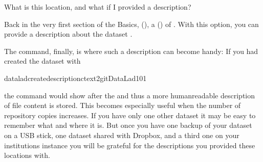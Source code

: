 \ignorespaces \begin{findoutmore}[label={fom-clone-description}, before title={\thetcbcounter\ }, float, floatplacement=tb, check odd page=true]{What is this location, and what if I provided a description?}
\label{\detokenize{basics/101-117-sharelocal2:fom-clone-description}}

\sphinxAtStartPar
Back in the very first section of the Basics, {\hyperref[\detokenize{basics/101-101-create:createds}]{}} (), a {\hyperref[\detokenize{basics/101-101-create:createdescription}]{}} ()   of .
With this option, you can provide a description about the dataset .

\sphinxAtStartPar
The  command, finally, is where such a description
can become handy: If you had created the dataset with

\begin{sphinxVerbatim}[commandchars=\\\{\}]
dataladcreate\PYGZhy{}\PYGZhy{}description\PYGZhy{}ctext2gitDataLad\PYGZhy{}101
\end{sphinxVerbatim}

\sphinxAtStartPar
the command would show  after
the {\hyperref[\detokenize{glossary:term-UUID}]{}} \textendash{} and thus a more human\sphinxhyphen{}readable description of 
file content is stored.
This becomes especially useful when the number of repository copies
increases. If you have only one other dataset it may be easy to
remember what and where it is. But once you have one back\sphinxhyphen{}up
of your dataset on a USB stick, one dataset shared with
Dropbox, and a third one on your institutions
{\hyperref[\detokenize{glossary:term-GitLab}]{}} instance you will be grateful for the descriptions
you provided these locations with.


\end{findoutmore}
